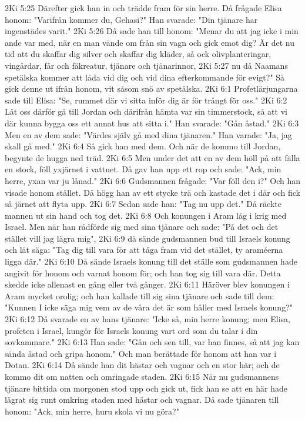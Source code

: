 2Ki 5:25  Därefter gick han in och trädde fram för sin herre. Då frågade Elisa honom: "Varifrån kommer du, Gehasi?" Han svarade: "Din tjänare har ingenstädes varit."
2Ki 5:26  Då sade han till honom: "Menar du att jag icke i min ande var med, när en man vände om från sin vagn och gick emot dig? Är det nu tid att du skaffar dig silver och skaffar dig kläder, så ock olivplanteringar, vingårdar, får och fäkreatur, tjänare och tjänarinnor,
2Ki 5:27  nu då Naamans spetälska kommer att låda vid dig och vid dina efterkommande för evigt?" Så gick denne ut ifrån honom, vit såsom snö av spetälska.
2Ki 6:1  Profetlärjungarna sade till Elisa: "Se, rummet där vi sitta inför dig är för trångt för oss."
2Ki 6:2  Låt oss därför gå till Jordan och därifrån hämta var sin timmerstock, så att vi där kunna bygga oss ett annat hus att sitta i." Han svarade: "Gån åstad."
2Ki 6:3  Men en av dem sade: "Värdes själv gå med dina tjänaren." Han varade: "Ja, jag skall gå med."
2Ki 6:4  Så gick han med dem. Och när de kommo till Jordan, begynte de hugga ned träd.
2Ki 6:5  Men under det att en av dem höll på att fälla en stock, föll yxjärnet i vattnet. Då gav han upp ett rop och sade: "Ack, min herre, yxan var ju lånad."
2Ki 6:6  Gudsmannen frågade: "Var föll den i?" Och han visade honom stället. Då högg han av ett stycke trä och kastade det i där och fick så järnet att flyta upp.
2Ki 6:7  Sedan sade han: "Tag nu upp det." Då räckte mannen ut sin hand och tog det.
2Ki 6:8  Och konungen i Aram låg i krig med Israel. Men när han rådförde sig med sina tjänare och sade: "På det och det stället vill jag lägra mig",
2Ki 6:9  då sände gudsmannen bud till Israels konung och lät säga: "Tag dig till vara för att tåga fram vid det stället, ty araméerna ligga där."
2Ki 6:10  Då sände Israels konung till det ställe som gudsmannen hade angivit för honom och varnat honom för; och han tog sig till vara där. Detta skedde icke allenast en gång eller två gånger.
2Ki 6:11  Häröver blev konungen i Aram mycket orolig; och han kallade till sig sina tjänare och sade till dem: "Kunnen I icke säga mig vem av de våra det är som håller med Israels konung?"
2Ki 6:12  Då svarade en av hans tjänare: "Icke så, min herre konung; men Elisa, profeten i Israel, kungör för Israels konung vart ord som du talar i din sovkammare."
2Ki 6:13  Han sade: "Gån och sen till, var han finnes, så att jag kan sända åstad och gripa honom." Och man berättade för honom att han var i Dotan.
2Ki 6:14  Då sände han dit hästar och vagnar och en stor här; och de kommo dit om natten och omringade staden.
2Ki 6:15  När nu gudsmannens tjänare bittida om morgonen stod upp och gick ut, fick han se att en här hade lägrat sig runt omkring staden med hästar och vagnar. Då sade tjänaren till honom: "Ack, min herre, huru skola vi nu göra?"
